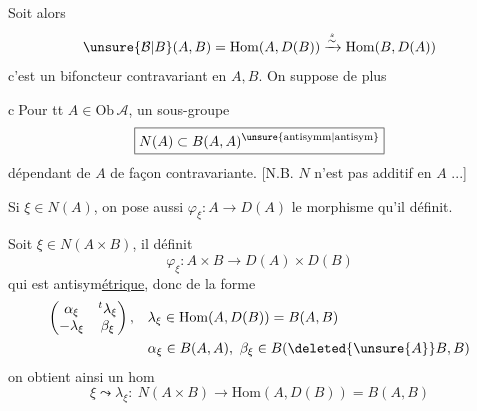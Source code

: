 \unsure{,} Soit alors
\[
 \unsure{\mathcal B|B}(A,B)=\mathrm{Hom}(A,D(B))
 \xrightarrow{\overset{s}{\sim}}\mathrm{Hom}(B,D(A))
\]
c'est un bifoncteur contravariant en $A,B$. On suppose de plus

\textcircled{c}\quad Pour tt $A\in\mathrm{Ob}\,\mathscr A$, un sous-groupe
\[
 \boxed{N(A)\subset B(A,A)^{\unsure{\text{antisymm}|\text{antisym}}}}
\]
dépendant de $A$ de façon contravariante.
[N.B. $N$ n'est pas additif en $A$ ...]

Si $\xi\in N(A)$, on pose aussi $\varphi_\xi:A\longrightarrow D(A)$
le morphisme qu'il définit.

Soit $\xi\in N(A\times B)$, il définit
\[
 \varphi_{\xi}: A\times B\longrightarrow D(A)\times D(B)
\]
qui est antisym\uline{étrique}, donc  de
la forme
\[
 \begin{aligned}
 \begin{pmatrix}\alpha_\xi&{}^t\lambda_\xi\\-\lambda_\xi&\beta_\xi\end{pmatrix},
 &\quad \lambda_\xi\in\mathrm{Hom}(A,D(B))=B(A,B)\\
 &\quad \alpha_\xi\in B(A,A),\ \beta_\xi\in B(\deleted{\unsure{A}}B,B)
 \end{aligned}
\]
on obtient ainsi un hom
\[
 \boxed{\xi\leadsto\lambda_\xi:\ N(A\times B)\longrightarrow
 \mathrm{Hom}(A,D(B))=B(A,B)}
\]


